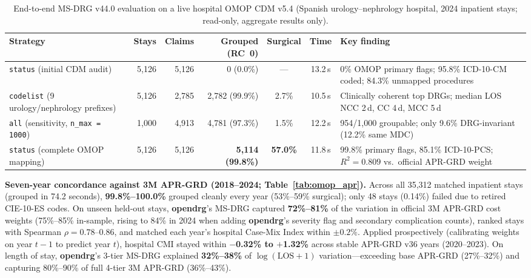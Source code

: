 \documentclass[fleqn,10pt]{IOMEDArticle}
\begin{document}
\begin{table}[!t]\centering
\caption{End-to-end MS-DRG v44.0 evaluation on a live hospital OMOP CDM v5.4 (Spanish urology--nephrology hospital, 2024 inpatient stays; read-only, aggregate results only).}
\label{tab:omop}
\scriptsize
\setlength{\tabcolsep}{4.5pt}
\begin{tabular}{@{}p{4.6cm}rrrccp{4.2cm}@{}}
\toprule
Strategy & Stays & Claims & Grouped (RC~0) & Surgical & Time & Key finding \\
\midrule
\texttt{status} (initial CDM audit) & 5{,}126 & 5{,}126 & 0 (0.0\%) & --- & 13.2\,s & 0\% OMOP primary flags; 95.8\% ICD-10-CM coded; 84.3\% unmapped procedures \\
\texttt{codelist} (9 urology/nephrology prefixes) & 5{,}126 & 2{,}785 & 2{,}782 (99.9\%) & 2.7\% & 10.5\,s & Clinically coherent top DRGs; median LOS NCC 2\,d, CC 4\,d, MCC 5\,d \\
\texttt{all} (sensitivity, \texttt{n\_max = 1000}) & 1{,}000 & 4{,}913 & 4{,}781 (97.3\%) & 1.5\% & 12.2\,s & 954/1{,}000 groupable; only 9.6\% DRG-invariant (12.2\% same MDC) \\
\texttt{status} (complete OMOP mapping) & 5{,}126 & 5{,}126 & \textbf{5{,}114 (99.8\%)} & \textbf{57.0\%} & 11.8\,s & 99.8\% primary flags, 85.1\% ICD-10-PCS; $R^2=0.809$ vs.\ official APR-GRD weight \\
\bottomrule
\end{tabular}
\end{table}

\textbf{Seven-year concordance against 3M APR-GRD (2018--2024; Table~\ref{tab:omop_apr}).} Across all 35{,}312 matched inpatient stays (grouped in 74.2 seconds), \textbf{99.8\%--100.0\%} grouped cleanly every year (53\%--59\% surgical); only 48 stays (0.14\%) failed due to retired CIE-10-ES codes. On unseen held-out stays, \textbf{opendrg}'s MS-DRG captured \textbf{72\%--81\%} of the variation in official 3M APR-GRD cost weights (75\%--85\% in-sample, rising to 84\% in 2024 when adding \textbf{opendrg}'s severity flag and secondary complication counts), ranked stays with Spearman $\rho = 0.78\text{--}0.86$, and matched each year's hospital Case-Mix Index within \textbf{$\pm 0.2\%$}. Applied prospectively (calibrating weights on year $t-1$ to predict year $t$), hospital CMI stayed within \textbf{$-$0.32\% to $+$1.32\%} across stable APR-GRD v36 years (2020--2023). On length of stay, \textbf{opendrg}'s 3-tier MS-DRG explained \textbf{32\%--38\%} of $\log(\text{LOS}+1)$ variation---exceeding base APR-GRD (27\%--32\%) and capturing 80\%--90\% of full 4-tier 3M APR-GRD (36\%--43\%).
\end{document}
